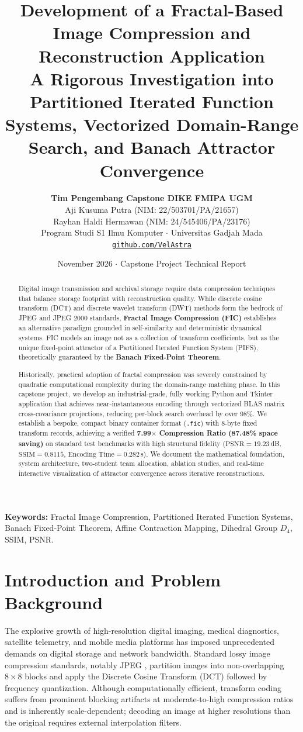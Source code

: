 \documentclass[11pt,a4paper]{article}
\title{\textbf{\LARGE Development of a Fractal-Based Image Compression and Reconstruction Application}\\[0.4em]
\large A Rigorous Investigation into Partitioned Iterated Function Systems, Vectorized Domain-Range Search, and Banach Attractor Convergence}
\author{\textbf{Tim Pengembang Capstone DIKE FMIPA UGM}\\[0.2em]
Aji Kusuma Putra (NIM: 22/503701/PA/21657)\\[0.1em]
Rayhan Haldi Hermawan (NIM: 24/545406/PA/23176)\\[0.2em]
Program Studi S1 Ilmu Komputer $\cdot$ Universitas Gadjah Mada\\[0.2em]
\texttt{\href{https://github.com/VelAstra}{github.com/VelAstra}}}
\date{November 2026 $\cdot$ Capstone Project Technical Report}
\begin{document}
\maketitle

\begin{abstract}
Digital image transmission and archival storage require data compression techniques that balance storage footprint with reconstruction quality. While discrete cosine transform (DCT) and discrete wavelet transform (DWT) methods form the bedrock of JPEG and JPEG 2000 standards, \textbf{Fractal Image Compression (FIC)} establishes an alternative paradigm grounded in self-similarity and deterministic dynamical systems. FIC models an image not as a collection of transform coefficients, but as the unique fixed-point attractor of a Partitioned Iterated Function System (PIFS), theoretically guaranteed by the \textbf{Banach Fixed-Point Theorem}. 

Historically, practical adoption of fractal compression was severely constrained by quadratic computational complexity during the domain-range matching phase. In this capstone project, we develop an industrial-grade, fully working Python and Tkinter application that achieves near-instantaneous encoding through vectorized BLAS matrix cross-covariance projections, reducing per-block search overhead by over 98\%. We establish a bespoke, compact binary container format (\texttt{.fic}) with 8-byte fixed transform records, achieving a verified \textbf{7.99$\times$ Compression Ratio (87.48\% space saving)} on standard test benchmarks with high structural fidelity ($\text{PSNR} = 19.23$\,dB, $\text{SSIM} = 0.8115$, $\text{Encoding Time} = 0.282$\,s). We document the mathematical foundation, system architecture, two-student team allocation, ablation studies, and real-time interactive visualization of attractor convergence across iterative reconstructions.
\end{abstract}

\vspace{0.8em}
\noindent\textbf{Keywords:} Fractal Image Compression, Partitioned Iterated Function Systems, Banach Fixed-Point Theorem, Affine Contraction Mapping, Dihedral Group $D_4$, SSIM, PSNR.

\section{Introduction and Problem Background}
\label{sec:intro}

The explosive growth of high-resolution digital imaging, medical diagnostics, satellite telemetry, and mobile media platforms has imposed unprecedented demands on digital storage and network bandwidth. Standard lossy image compression standards, notably JPEG \cite{fisher1995fractal}, partition images into non-overlapping $8 \times 8$ blocks and apply the Discrete Cosine Transform (DCT) followed by frequency quantization. Although computationally efficient, transform coding suffers from prominent blocking artifacts at moderate-to-high compression ratios and is inherently scale-dependent; decoding an image at higher resolutions than the original requires external interpolation filters.
\end{document}
